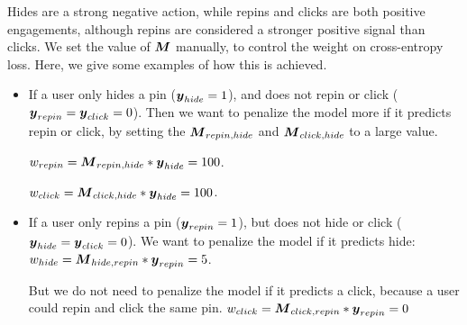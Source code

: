 Hides are a strong negative action, while repins and clicks are both positive engagements, although repins are considered a stronger positive signal than clicks.
We set the value of $\boldsymbol{M}$ manually, to control the weight on cross-entropy loss. Here, we give some examples of how this is achieved.
\begin{itemize}

\item If a user only hides a pin ($\boldsymbol{y}_{hide}=1$), and does not repin or click ($\boldsymbol{y}_{repin}=\boldsymbol{y}_{click}=0$). Then we want to penalize the model more if it predicts repin or click, by setting the $\boldsymbol{M}_{repin, hide}$ and $\boldsymbol{M}_{click, hide}$ to a large value. 


$w_{repin}=\boldsymbol{M}_{repin, hide} * \boldsymbol{y}_{hide} =100$.

$w_{click}=\boldsymbol{M}_{click, hide}  * \boldsymbol{y}_{hide}  =100$.


\item If a user only repins a pin ($\boldsymbol{y}_{repin}=1$), but does not hide or click ($\boldsymbol{y}_{hide}=\boldsymbol{y}_{click}=0$). We want to penalize the model if it predicts hide: $w_{hide} = \boldsymbol{M}_{hide,repin} * \boldsymbol{y}_{repin} = 5$. 

But we do not need to penalize the model if it predicts a click, because a user could repin and click the same pin.
$w_{click} =  \boldsymbol{M}_{click, repin} * \boldsymbol{y}_{repin} = 0$
 \end{itemize}


